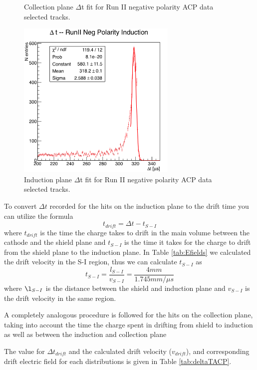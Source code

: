 \begin{figure}[h!]
\begin{minipage}{0.40\textwidth}
\caption{Collection plane $\Delta$t fit for Run II negative polarity ACP data  selected tracks.}
\label{fig:Run2NegColFit}
\end{minipage}\hfill
\begin{minipage}{0.40\textwidth}
\centering
\includegraphics[width=3in]{images/RunIINegInd.png}
\caption{Induction plane $\Delta$t fit for Run II negative polarity ACP data  selected tracks.}
\label{fig:Run2NegIndFit}
\end{minipage}
\end{figure}

To convert $\Delta t$ recorded for the hits on the induction plane to the drift time you can utilize the formula
\begin{equation}
t_{drift} = \Delta t - t_{S-I}
\end{equation}
where $t_{drift}$ is the time the charge takes to drift in the main volume between the cathode and the shield plane and $t_{S-I}$ is the time it takes for the charge to drift from the shield plane to the induction plane. In Table \ref{tab:Efields} we calculated the drift velocity in the S-I region, thus we can calculate $t_{S-I}$ as 
\begin{equation}
t_{S-I} = \frac{l_{S-I}}{v_{S-I}} = \frac{4 mm}{1.745 mm/ \mu s}
\end{equation}
where $\l_{S-I}$ is the distance between the shield and induction plane and $v_{S-I}$ is the drift velocity in the same region.

A completely analogous procedure is followed for the hits on the collection plane, taking into account the time the charge spent in drifting from shield to induction as well as between the induction and collection plane

The value for $\Delta t_{drift}$ and the calculated drift velocity ($v_{drift}$), and corresponding drift electric field for each distributions is given in Table \ref{tab:deltaTACP}.

